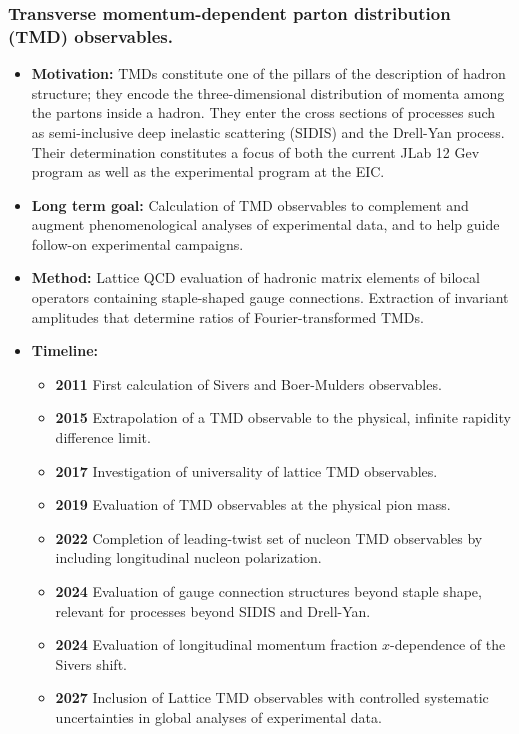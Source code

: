 \documentclass[12pt,hyperpdf]{article}
\begin{document}
\subsubsection{Transverse momentum-dependent parton distribution
(TMD) observables.}
\begin{itemize}
\item{\bf Motivation:} TMDs constitute one of the pillars of the description
of hadron structure; they encode the three-dimensional distribution of
momenta among the partons inside a hadron. They enter the cross sections
of processes such as semi-inclusive deep inelastic scattering (SIDIS) and
the Drell-Yan process. Their determination constitutes a focus of both the
current JLab 12 Gev program as well as the experimental program at the EIC.
\item{\bf Long term goal:} Calculation of TMD observables to
complement and augment phenomenological analyses of experimental data,
and to help guide follow-on experimental campaigns.
\item{\bf Method:} Lattice QCD evaluation of hadronic matrix elements of
bilocal operators containing staple-shaped gauge connections. Extraction
of invariant amplitudes that determine ratios of Fourier-transformed TMDs.
\item{\bf Timeline:}
\begin{itemize}
\item{\bf 2011} First calculation of Sivers and Boer-Mulders observables.
\item{\bf 2015} Extrapolation of a TMD observable to the physical, infinite
rapidity difference limit.
\item{\bf 2017} Investigation of universality of lattice TMD observables.
\item{\bf 2019} Evaluation of TMD observables at the physical pion mass.
\item{\bf 2022} Completion of leading-twist set of nucleon TMD observables by
including longitudinal nucleon polarization.
\item{\bf 2024} Evaluation of gauge connection structures beyond staple shape,
relevant for processes beyond SIDIS and Drell-Yan.
\item{\bf 2024} Evaluation of longitudinal momentum fraction $x$-dependence
of the Sivers shift.
\item{\bf 2027} Inclusion of Lattice TMD observables with controlled systematic
uncertainties in global analyses of experimental data.
\end{itemize}
\end{itemize}
\end{document}
